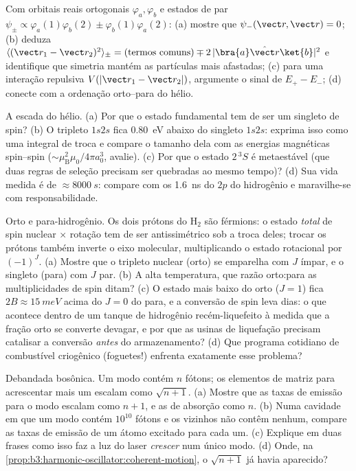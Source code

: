 \begin{exercise}[$\star\star$]\label{exo:b3:identical-particles:6}
Com orbitais reais ortogonais $\varphi_a, \varphi_b$ e estados de par
$\psi_\pm \propto \varphi_a(1)\varphi_b(2) \pm
\varphi_b(1)\varphi_a(2)$: (a) mostre que $\psi_-(\vect r, \vect r) = 0$;
(b) deduza
$\langle(\vect r_1 - \vect r_2)^2\rangle_\pm =
(\text{termos comuns}) \mp 2\,|\bra{a}\hat{\vect r}\ket{b}|^2$ e
identifique que simetria mantém as partículas mais afastadas; (c) para
uma interação repulsiva $V(|\vect r_1 - \vect r_2|)$, argumente o sinal
de $E_+ - E_-$; (d) conecte com a ordenação orto--para do hélio.
\end{exercise}

\begin{exercise}[$\star\star$]\label{exo:b3:identical-particles:7}
A escada do hélio. (a) Por que o estado fundamental tem de ser um
singleto de spin? (b) O tripleto $1s2s$ fica \qty{0.80}{eV} abaixo do
singleto $1s2s$: exprima isso como uma integral de troca e compare o
tamanho dela com as energias magnéticas spin--spin
($\sim\mu_{\text{B}}^2\mu_0/4\pi
a_0^3$, avalie). (c) Por que o estado $2\,^3S$ é metaestável (que duas
regras de seleção precisam ser quebradas ao mesmo tempo)? (d) Sua vida
medida é de $\approx\qty{8000}{s}$: compare com os \qty{1.6}{ns} do
$2p$ do hidrogênio e maravilhe-se com responsabilidade.
\end{exercise}

\begin{exercise}[$\star\star$]\label{exo:b3:identical-particles:8}
Orto e para-hidrogênio. Os dois prótons do H$_2$ são férmions: o estado
\emph{total} de spin nuclear $\times$ rotação tem de ser antissimétrico
sob a troca deles; trocar os prótons também inverte o eixo molecular,
multiplicando o estado rotacional por $(-1)^J$. (a) Mostre que o
tripleto nuclear (orto) se emparelha com $J$ ímpar, e o singleto (para)
com $J$ par. (b) A alta temperatura, que razão orto:para as
multiplicidades de spin ditam? (c) O estado mais baixo do orto
($J = 1$) fica $2B \approx \qty{15}{meV}$ acima do $J = 0$ do para, e a
conversão de spin leva dias: o que acontece dentro de um tanque de
hidrogênio recém-liquefeito à medida que a fração orto se converte
devagar, e por que as usinas de liquefação precisam catalisar a
conversão \emph{antes} do armazenamento? (d) Que programa cotidiano de
combustível criogênico (foguetes!) enfrenta exatamente esse problema?
\end{exercise}

\begin{exercise}[$\star\star$]\label{exo:b3:identical-particles:9}
Debandada bosônica. Um modo contém $n$ fótons; os elementos de matriz
para acrescentar mais um escalam como $\sqrt{n+1}$. (a) Mostre que as
taxas de emissão para o modo escalam como $n + 1$, e as de absorção
como $n$. (b) Numa cavidade em que um modo contém $10^{10}$ fótons e os
vizinhos não contêm nenhum, compare as taxas de emissão de um átomo
excitado para cada um. (c) Explique em duas frases como isso faz a luz
do laser \emph{crescer} num único modo. (d) Onde, na
\cref{prop:b3:harmonic-oscillator:coherent-motion}, o $\sqrt{n+1}$ já
havia aparecido?
\end{exercise}

